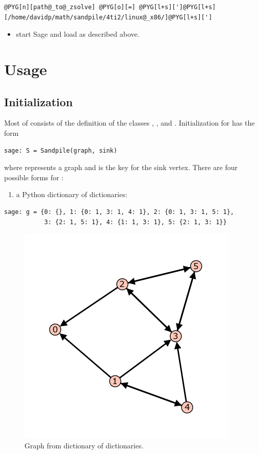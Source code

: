 \documentclass[letterpaper,10pt,english]{manual}
\begin{document}
\begin{Verbatim}[commandchars=@\[\]]
@PYG[n][path@_to@_zsolve] @PYG[o][=] @PYG[l+s][']@PYG[l+s][/home/davidp/math/sandpile/4ti2/linux@_x86/]@PYG[l+s][']
\end{Verbatim}
\begin{itemize}
\item {} 
start Sage and load  as described above.

\end{itemize}


\chapter{Usage}


\section{Initialization}

Most of  consists of the definition of the classes
, , and .
Initialization for  has the form

\begin{Verbatim}[commandchars=@\[\]]
sage: S = Sandpile(graph, sink)
\end{Verbatim}

where  represents a graph and  is the key for the sink
vertex.  There are four possible forms for :
\begin{enumerate}
\item {} 
a Python dictionary of dictionaries:

\end{enumerate}

\begin{Verbatim}[commandchars=@\[\]]
sage: g = {0: {}, 1: {0: 1, 3: 1, 4: 1}, 2: {0: 1, 3: 1, 5: 1},
           3: {2: 1, 5: 1}, 4: {1: 1, 3: 1}, 5: {2: 1, 3: 1}}
\end{Verbatim}
\begin{figure}[htbp]
\centering

\includegraphics{initial.png}
\caption{Graph from dictionary of dictionaries.}\end{figure}
\end{document}
